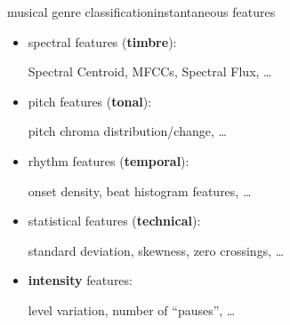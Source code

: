         \begin{frame}{musical genre classification}{instantaneous features}
            \begin{itemize}
                \item	spectral features (\textbf{timbre}):
                
                    Spectral Centroid, MFCCs, Spectral Flux, \ldots
                \smallskip
                \item<2->	pitch features (\textbf{tonal}):
                
                    pitch chroma distribution/change, \ldots
                \smallskip
                \item<3->	rhythm features (\textbf{temporal}):
                
                    onset density, beat histogram features, \ldots
                \smallskip
                \item<4->	statistical features (\textbf{technical}):
                
                    standard deviation, skewness, zero crossings, \ldots
                \smallskip
                \item<5->	\textbf{intensity} features:
                
                    level variation, number of ``pauses'', \ldots
            \end{itemize}	
        \end{frame}

